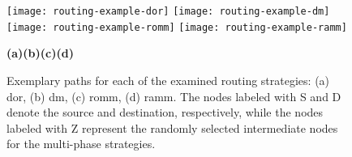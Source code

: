 \begin{figure}
    \texttt{[image: routing-example-dor]}\hfill
    \texttt{[image: routing-example-dm]}\hfill
    \texttt{[image: routing-example-romm]}\hfill
    \texttt{[image: routing-example-ramm]}\\
    \vspace{0.5\baselineskip}
    \begin{footnotesize}
        \hspace*{0.08\textwidth}\textbf{(a)}\hfill\textbf{(b)}\hfill\textbf{(c)}\hfill\textbf{(d)}\hspace*{0.08\textwidth}
    \end{footnotesize}
    \caption[Exemplary paths for the examined routing strategies]{Exemplary paths for each of the examined routing strategies: (a) \gls{dor}, (b)
    \gls{dm}, (c) \gls{romm}, (d) \gls{ramm}. The nodes labeled with S and D denote the source and destination, respectively, while the nodes labeled
    with Z represent the randomly selected intermediate nodes for the multi-phase strategies.}
    \label{fig:allstrategiespaths}
\end{figure}
